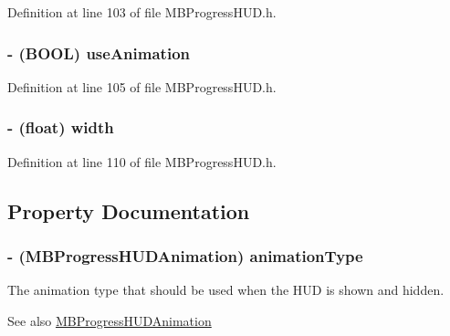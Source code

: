 Definition at line 103 of file MBProgressHUD.h.

\hypertarget{interface_m_b_progress_h_u_d_a46218ca7550d93cf0d9f10b864889f43}{
\subsubsection[{useAnimation}]{\setlength{\rightskip}{0pt plus 5cm}-\/ (BOOL) {\bf useAnimation}}}
\label{interface_m_b_progress_h_u_d_a46218ca7550d93cf0d9f10b864889f43}


Definition at line 105 of file MBProgressHUD.h.

\hypertarget{interface_m_b_progress_h_u_d_ae426f00e82704fa09578f5446e22d915}{
\subsubsection[{width}]{\setlength{\rightskip}{0pt plus 5cm}-\/ (float) {\bf width}}}
\label{interface_m_b_progress_h_u_d_ae426f00e82704fa09578f5446e22d915}


Definition at line 110 of file MBProgressHUD.h.



\subsection{Property Documentation}
\hypertarget{interface_m_b_progress_h_u_d_a58c96d0d9d41e71d1f6e5490fa86fa96}{
\subsubsection[{animationType}]{\setlength{\rightskip}{0pt plus 5cm}-\/ ({\bf MBProgressHUDAnimation}) animationType}}
\label{interface_m_b_progress_h_u_d_a58c96d0d9d41e71d1f6e5490fa86fa96}
The animation type that should be used when the HUD is shown and hidden.

\begin{DoxySeeAlso}{See also}
\hyperlink{_m_b_progress_h_u_d_8h_a892ebf586d23b21a74bc54138ca25990}{MBProgressHUDAnimation} 
\end{DoxySeeAlso}


